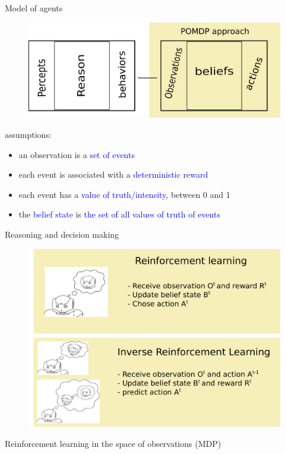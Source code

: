 \documentclass[compress]{beamer}
\begin{document}
\begin{frame}{Model of agents}
\centering
\begin{figure}
\includegraphics[width=1.\columnwidth]{pomdp}
\end{figure}
assumptions:
\begin{itemize}
\item an observation is a \textcolor{blue}{set of events}
\item each event is associated with a \textcolor{blue}{deterministic reward}
\item each event has a \textcolor{blue}{value of truth/intensity}, between 0 and 1
\item the \textcolor{blue}{belief state} is \textcolor{blue}{the set of all values of truth of events}
\end{itemize}
\end{frame}

\begin{frame}{Reasoning and decision making}
\centering
\begin{figure}
\includegraphics[width=.9\columnwidth]{RL_IRL}
\end{figure}
Reinforcement learning in the space of observations (MDP)
\end{frame}
\end{document}
